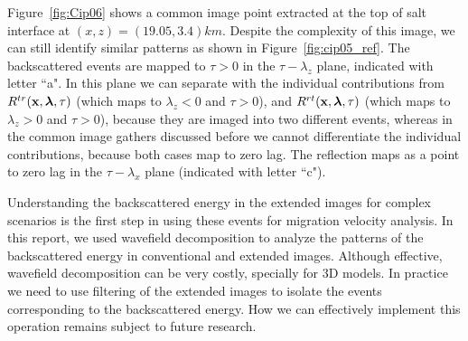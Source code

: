 Figure~\ref{fig:Cip06} shows a common image point extracted at the top of salt interface at $(x,z)=(19.05,3.4)km$. Despite the complexity of this image, we can still
identify similar patterns as shown in Figure~\ref{fig:cip05_ref}. The backscattered events are mapped to $\tau>0$ in the
$\tau-\lambda_z$ plane, indicated with letter ``a". In this plane we can separate with the individual contributions 
from $R^{tr}({\bf x},{\boldsymbol{\lambda}},\tau)$ (which maps to $\lambda_z<0$ and $\tau>0$), and $R^{rt}({\bf x},{\boldsymbol{\lambda}},\tau)$ (which maps to $\lambda_z>0$ and $\tau>0$), because they are imaged into two different events, 
whereas in the common image gathers discussed before we cannot differentiate the individual
contributions, because both cases map to zero lag. The reflection maps as a point to zero lag in the $\tau-\lambda_x$ plane (indicated with letter ``c"). 

Understanding the backscattered energy in the extended images for complex scenarios is the first step in using these events for 
migration velocity analysis. In this report, we used wavefield decomposition to analyze the patterns of the backscattered energy in conventional and extended images.
 Although effective, wavefield decomposition can be very costly, specially for 3D models. In practice we need to use filtering of the extended images to isolate the events corresponding to 
the backscattered energy. How we can effectively  implement this operation remains subject to future research.





